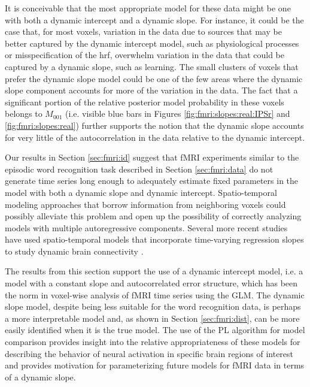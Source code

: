 It is conceivable that the most appropriate model for these data might be one with both a dynamic intercept and a dynamic slope. For instance, it could be the case that, for most voxels, variation in the data due to sources that may be better captured by the dynamic intercept model, such as physiological processes or misspecification of the hrf, overwhelm variation in the data that could be captured by a dynamic slope, such as learning. The small clusters of voxels that prefer the dynamic slope model could be one of the few areas where the dynamic slope component accounts for more of the variation in the data. The fact that a significant portion of the relative posterior model probability in these voxels belongs to $M_{001}$ (i.e. visible blue bars in Figures \ref{fig:fmri:slopes:real:IPSr} and \ref{fig:fmri:slopes:real}) further supports the notion that the dynamic slope accounts for very little of the autocorrelation in the data relative to the dynamic intercept.

Our results in Section \ref{sec:fmri:id} suggest that fMRI experiments similar to the episodic word recognition task described in Section \ref{sec:fmri:data} do not generate time series long enough to adequately estimate fixed parameters in the model with both a dynamic slope and dynamic intercept. Spatio-temporal modeling approaches that borrow information from neighboring voxels could possibly alleviate this problem and open up the possibility of correctly analyzing models with multiple autoregressive components. Several more recent studies have used spatio-temporal models that incorporate time-varying regression slopes to study dynamic brain connectivity \citep{ho:ombao:2005:statespace,bhatt:matira:aoas:2011}.

The results from this section support the use of a dynamic intercept model, i.e. a model with a constant slope and autocorrelated error structure, which has been the norm in voxel-wise analysis of fMRI time series using the GLM. The dynamic slope model, despite being less suitable for the word recognition data, is perhaps a more interpretable model and, as shown in Section \ref{sec:fmri:dist}, can be more easily identified when it is the true model. The use of the PL algorithm for model comparison provides insight into the relative appropriateness of these models for describing the behavior of neural activation in specific brain regions of interest and provides motivation for parameterizing future models for fMRI data in terms of a dynamic slope. 